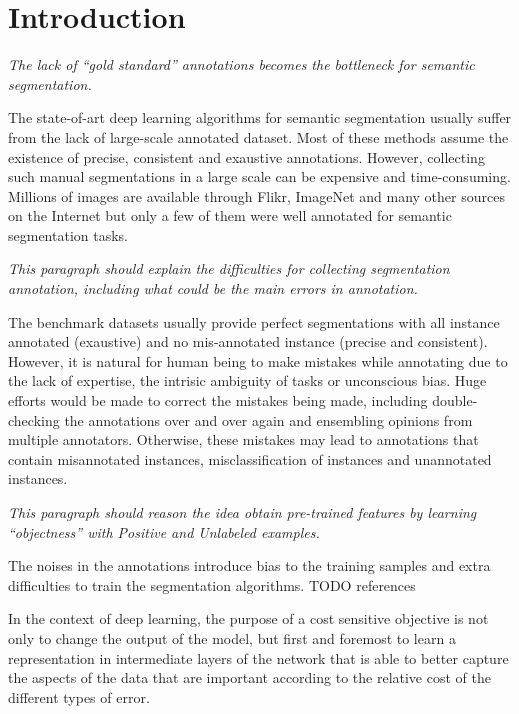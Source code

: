 \section{Introduction}
\label{introduction}

\noindent
\textit{The lack of ``gold standard'' annotations becomes the bottleneck for semantic segmentation.}

\noindent
The state-of-art deep learning algorithms for semantic segmentation \cite{long2015fully} usually suffer from the lack of large-scale annotated dataset.
Most of these methods assume the existence of precise, consistent and exaustive annotations. However, collecting such manual segmentations in a large scale can be expensive and time-consuming.
Millions of images are available through Flikr, ImageNet and many other sources on the Internet but only a few of them were well annotated for semantic segmentation tasks. \cite{everingham2015pascal,mottaghi2014role,lin2014microsoft}


\noindent
\textit{This paragraph should explain the difficulties for collecting segmentation annotation, including what could be the main errors in annotation.}

\noindent
The benchmark datasets usually provide perfect segmentations with all instance annotated (exaustive) and no mis-annotated instance (precise and consistent).
However, it is natural for human being to make mistakes while annotating due to the lack of expertise, the intrisic ambiguity of tasks or unconscious bias.
Huge efforts would be made to correct the mistakes being made, including double-checking the annotations over and over again and ensembling opinions from multiple annotators.
Otherwise, these mistakes may lead to annotations that contain misannotated instances, misclassification of instances and unannotated instances.


\noindent
\textit{This paragraph should reason the idea obtain pre-trained features by learning ``objectness'' with Positive and Unlabeled examples.}

\noindent
The noises in the annotations introduce bias to the training samples and extra difficulties to train the segmentation algorithms. {TODO references}

In the context of deep learning, the purpose of a cost sensitive objective is
not only to change the output of the model, but first and foremost to learn a representation in intermediate layers of the network that is able to better capture the aspects of the data that are important according to the relative cost of the different types of error.

